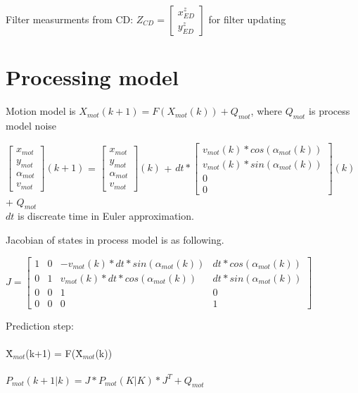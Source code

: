 \documentclass[11pt,a4paper]{article}
\begin{document}
\noindent Filter measurments from CD: $Z_{CD} = \begin{bmatrix} x_{ED}^{z} \\ y_{ED}^{z} \end{bmatrix}$ for filter updating


\section{Processing model}

Motion model is   $X_{mot}(k+1) = F(X_{mot}(k)) + Q_{mot}$, where $Q_{mot}$ is process model noise

$\begin{bmatrix} x_{mot} \\ y_{mot} \\ \alpha_{mot} \\ v_{mot} \end{bmatrix}(k+1)$ = $\begin{bmatrix} x_{mot} \\ y_{mot} \\ \alpha_{mot} \\ v_{mot} \end{bmatrix}(k)$ + $dt*\begin{bmatrix} v_{mot}(k)*cos(\alpha_{mot}(k)) \\ v_{mot}(k)*sin(\alpha_{mot}(k)) \\ 0 \\ 0 \end{bmatrix}(k)$ + $ Q_{mot}$
\\
$dt$ is discreate time in Euler approximation.


\noindent Jacobian of states in process model is as following.

\begin{adjustwidth}{ 0cm}{}
\noindent $J=\begin{bmatrix}    
						 1 & 0 & -v_{mot}(k)*dt*sin(\alpha_{mot}(k)) &  dt*cos(\alpha_{mot}(k)) \\
						 0 & 1 &  v_{mot}(k)*dt*cos(\alpha_{mot}(k)) & dt*sin(\alpha_{mot}(k)) \\
						 0 & 0 & 1 & 0 \\
						 0 & 0 & 0 & 1 
\end{bmatrix}$
\end{adjustwidth}


\noindent Prediction step:
\\
\\
\^{X$_{mot}$(k+1)} = F(\^{X$_{mot}$(k)})
\\
\\
\noindent $P_{mot}(k+1|k) = J*P_{mot}(K|K)*J^{T} + Q_{mot}$
\\
\end{document}
